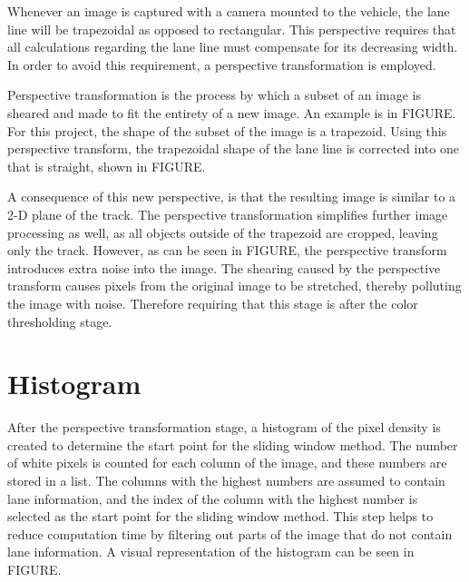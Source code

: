 \documentclass[arbeit=studie,oneside,BCOR=12mm]{ArbeitRST}
\begin{document}
Whenever an image is captured with a camera mounted to the vehicle, the lane
line will be trapezoidal as opposed to rectangular. This perspective requires
that all calculations regarding the lane line must compensate for its
decreasing width. In order to avoid this requirement, a perspective
transformation is employed. 

Perspective transformation is the process by which
a subset of an image is sheared and made to fit the entirety of a new image. An
example is in FIGURE. For this project, the shape of the subset of the image is
a trapezoid. Using this perspective transform, the trapezoidal shape of the lane
line is corrected into one that is straight, shown in FIGURE.

A consequence of this new perspective, is that the resulting image is similar
to a 2-D plane of the track. The perspective transformation simplifies further
image processing as well, as all objects outside of the trapezoid are cropped,
leaving only the track. However, as can be seen in FIGURE, the perspective
transform introduces extra noise into the image. The shearing caused by the
perspective transform causes pixels from the original image to be stretched,
thereby polluting the image with noise. Therefore requiring that this stage
is after the color thresholding stage.

\section{Histogram}

\iffalse

After the perspective transformation stage, a histogram of the pixel density 
is created. During this step, the start point for the sliding window method is
found. 

At every column of the image, the number of white pixels are counted. 
The numbers are then placed into a list. The assumption is then that the 
columns containing the largest numbers contain the lane information. The 
index with the number is then selected as the start point for the sliding 
window method. This pipeline stage reduces computation time by filtering out 
unnecessary parts of the image not containing lane information. A visual 
representation of the histogram can be seen in FIGURE.

\fi

After the perspective transformation stage, a histogram of the pixel density is
created to determine the start point for the sliding window method. The number
of white pixels is counted for each column of the image, and these numbers are
stored in a list. The columns with the highest numbers are assumed to contain
lane information, and the index of the column with the highest number is
selected as the start point for the sliding window method. This step helps to
reduce computation time by filtering out parts of the image that do not contain
lane information. A visual representation of the histogram can be seen in
FIGURE.
\end{document}
